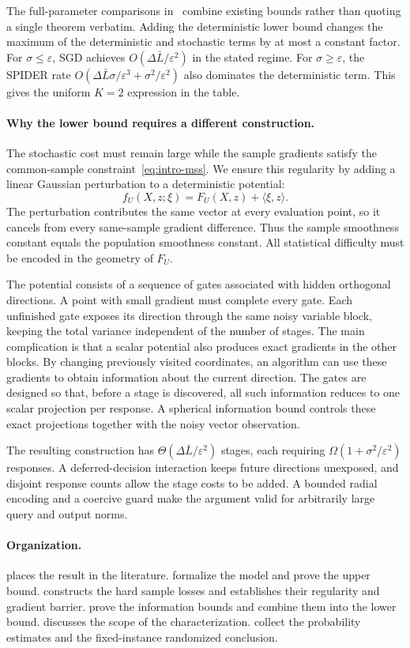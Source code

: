 \documentclass[11pt]{article}
\newcommand{\eps}{\varepsilon}
\theoremstyle{definition}
\theoremstyle{remark}
\begin{document}
The full-parameter comparisons in~ combine existing
bounds rather than quoting a single theorem verbatim. Adding the
deterministic lower bound changes the maximum of the deterministic and
stochastic terms by at most a constant factor. For $\sigma\le\eps$, SGD
achieves $O(\Delta\bar L/\eps^2)$ in the stated regime. For
$\sigma\ge\eps$, the SPIDER rate
$O(\Delta\bar L\sigma/\eps^3+\sigma^2/\eps^2)$ also dominates the
deterministic term. This gives the uniform $K=2$ expression in the table.

\paragraph{Why the lower bound requires a different construction.}
The stochastic cost must remain large while the sample gradients satisfy
the common-sample constraint~\eqref{eq:intro-mss}. We ensure this regularity
by adding a linear Gaussian perturbation to a deterministic potential:
\[
 f_U(X,z;\xi)=F_U(X,z)+\langle\xi,z\rangle.
\]
The perturbation contributes the same vector at every evaluation point, so
it cancels from every same-sample gradient difference. Thus the sample
smoothness constant equals the population smoothness constant. All
statistical difficulty must be encoded in the geometry of $F_U$.

The potential consists of a sequence of gates associated with hidden
orthogonal directions. A point with small gradient must complete every
gate. Each unfinished gate exposes its direction through the same noisy
variable block, keeping the total variance independent of the number of
stages. The main complication is that a scalar potential also produces
exact gradients in the other blocks. By changing previously visited
coordinates, an algorithm can use these gradients to obtain information
about the current direction. The gates are designed so that, before a
stage is discovered, all such information reduces to one scalar projection
per response. A spherical information bound controls these exact
projections together with the noisy vector observation.

The resulting construction has
$\Theta(\Delta\bar L/\eps^2)$ stages, each requiring
$\Omega(1+\sigma^2/\eps^2)$ responses. A deferred-decision interaction
keeps future directions unexposed, and disjoint response counts allow the
stage costs to be added. A bounded radial encoding and a coercive guard
make the argument valid for arbitrarily large query and output norms.

\paragraph{Organization.}
 places the result in the literature.
 formalize the model and prove the upper bound.
 constructs the hard sample losses and establishes
their regularity and gradient barrier. 
prove the information bounds and combine them into the lower bound.
 discusses the scope of the characterization.
 collect the probability estimates and the
fixed-instance randomized conclusion.
\end{document}
